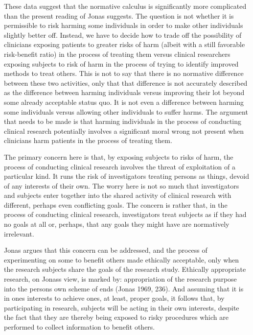 \documentclass[12p]{article}
\begin{document}
These data suggest that the normative calculus is significantly more complicated than the present reading of Jonas suggests. The question is not whether it is permissible to risk harming some individuals in order to make other individuals slightly better off. Instead, we have to decide how to trade off the possibility of clinicians exposing patients to greater risks of harm (albeit with a still favorable risk-benefit ratio) in the process of treating them versus clinical researchers exposing subjects to risk of harm in the process of trying to identify improved methods to treat others. This is not to say that there is no normative difference between these two activities, only that that difference is not accurately described as the difference between harming individuals versus improving their lot beyond some already acceptable status quo. It is not even a difference between harming some individuals versus allowing other individuals to suffer harms. The argument that needs to be made is that harming individuals in the process of conducting clinical research potentially involves a significant moral wrong not present when clinicians harm patients in the process of treating them.

The primary concern here is that, by exposing subjects to risks of harm, the process of conducting clinical research involves the threat of exploitation of a particular kind. It runs the risk of investigators treating persons as things, devoid of any interests of their own. The worry here is not so much that investigators and subjects enter together into the shared activity of clinical research with different, perhaps even conflicting goals. The concern is rather that, in the process of conducting clinical research, investigators treat subjects as if they had no goals at all or, perhaps, that any goals they might have are normatively irrelevant.

Jonas argues that this concern can be addressed, and the process of experimenting on some to benefit others made ethically acceptable, only when the research subjects share the goals of the research study. Ethically appropriate research, on Jonass view, is marked by: appropriation of the research purpose into the persons own scheme of ends (Jonas 1969, 236). And assuming that it is in ones interests to achieve ones, at least, proper goals, it follows that, by participating in research, subjects will be acting in their own interests, despite the fact that they are thereby being exposed to risky procedures which are performed to collect information to benefit others.
\end{document}
